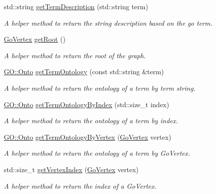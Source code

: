 \begin{DoxyCompactItemize}
std\+::string \hyperlink{classGoGraph_abd5d984dd3e1df3d754b1f7e86c487ee}{get\+Term\+Description} (std\+::string term)
\begin{DoxyCompactList}\small\item\em A helper method to return the string description based on the go term. \end{DoxyCompactList}\item 
\hyperlink{classGoGraph_afabec0fb17c98de989e7dd9f3a54e650}{Go\+Vertex} \hyperlink{classGoGraph_a1e8f6565c1cdab44ffbbdcd771246f7c}{get\+Root} ()
\begin{DoxyCompactList}\small\item\em A helper method to return the root of the graph. \end{DoxyCompactList}\item 
\hyperlink{namespaceGO_a5ae335887b5cf40a9ef3045be9247fc3}{G\+O\+::\+Onto} \hyperlink{classGoGraph_a9f4f553098e14270f07e7791cfe65447}{get\+Term\+Ontology} (const std\+::string \&term)
\begin{DoxyCompactList}\small\item\em A helper method to return the ontology of a term by term string. \end{DoxyCompactList}\item 
\hyperlink{namespaceGO_a5ae335887b5cf40a9ef3045be9247fc3}{G\+O\+::\+Onto} \hyperlink{classGoGraph_a0531ffa131c90e9871e280aa5faeaa42}{get\+Term\+Ontology\+By\+Index} (std\+::size\+\_\+t index)
\begin{DoxyCompactList}\small\item\em A helper method to return the ontology of a term by index. \end{DoxyCompactList}\item 
\hyperlink{namespaceGO_a5ae335887b5cf40a9ef3045be9247fc3}{G\+O\+::\+Onto} \hyperlink{classGoGraph_a3ae1998fd4765b2f952290150a7d164b}{get\+Term\+Ontology\+By\+Vertex} (\hyperlink{classGoGraph_afabec0fb17c98de989e7dd9f3a54e650}{Go\+Vertex} vertex)
\begin{DoxyCompactList}\small\item\em A helper method to return the ontology of a term by Go\+Vertex. \end{DoxyCompactList}\item 
std\+::size\+\_\+t \hyperlink{classGoGraph_a524fd1ade5d14d4dc3c900bf82162be6}{get\+Vertex\+Index} (\hyperlink{classGoGraph_afabec0fb17c98de989e7dd9f3a54e650}{Go\+Vertex} vertex)
\begin{DoxyCompactList}\small\item\em A helper method to return the index of a Go\+Vertex. \end{DoxyCompactList}\item 

\end{DoxyCompactItemize}
